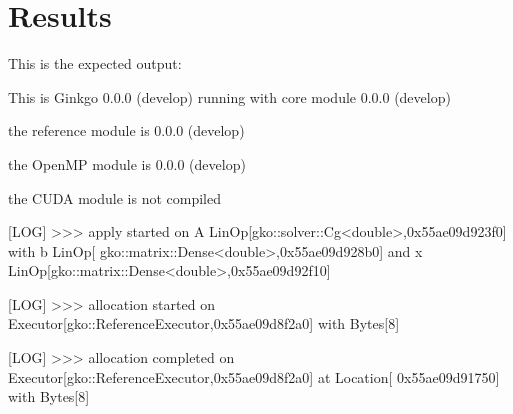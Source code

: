 \section*{Results}

This is the expected output\+:


\begin{DoxyCode}
This is Ginkgo 0.0.0 (develop)
    running with core module 0.0.0 (develop)                                                               
                                                                                                                  
                                                               
    the reference module is  0.0.0 (develop)                                                               
                                                                                                                  
                                                               
    the OpenMP    module is  0.0.0 (develop)                                                               
                                                                                                                  
                                                               
    the CUDA      module is  not compiled                                                                  
                                                                                                                  
                                                               
[LOG] >>> apply started on A LinOp[gko::solver::Cg<double>,0x55ae09d923f0] with b LinOp[
      gko::matrix::Dense<double>,0x55ae09d928b0] and x LinOp[gko::matrix::Dense<double>,0x55ae09d92f10]                              
                                                               
[LOG] >>> allocation started on Executor[gko::ReferenceExecutor,0x55ae09d8f2a0] with Bytes[8]              
                                                                                                                  
                                                               
[LOG] >>> allocation completed on Executor[gko::ReferenceExecutor,0x55ae09d8f2a0] at Location[
      0x55ae09d91750] with Bytes[8]                                                                                            
                                                               

\end{DoxyCode}
